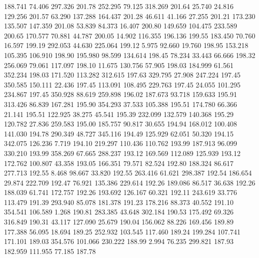  188.741   74.406  297.326       201.78
 252.295   79.125  318.269       201.64
  25.740   24.816  129.256       201.57
  63.290  137.288  164.437       201.28
  46.611   41.166   27.255       201.21
 173.230  135.507  147.359       201.08
  53.839   84.373   16.407       200.80
 149.659  104.475  233.589       200.65
 170.577   70.881   44.787       200.05
  14.902  116.355  196.136       199.55
 183.450   70.760   16.597       199.19
 292.053   44.630  225.064       199.12
   5.975   92.660   19.760       198.95
 153.218  105.395  106.910       198.90
 195.980   98.599  134.614       198.45
  78.234   33.443   66.666       198.32
 256.069   79.061  117.097       198.10
  11.675  130.756   57.905       198.03
 184.999   61.561  352.234       198.03
 171.520  113.282  312.615       197.63
 329.795   27.908  247.224       197.45
 350.585  150.111   22.436       197.45
 113.091  108.495  229.763       197.45
  24.055  101.295  234.867       197.45
 350.928   88.619  259.898       196.02
 187.673   93.718  159.633       195.91
 313.426   86.839  167.281       195.90
 354.293   37.533  105.388       195.51
 174.780   66.366   21.141       195.51
 122.925   38.275   45.541       195.39
 232.099  132.579  140.368       195.29
 120.782   27.836  259.583       195.00
 185.757   90.817   30.655       194.94
 168.012  100.408  141.030       194.78
 290.349   48.727  345.116       194.49
 125.929   62.051   50.320       194.15
 342.075  126.236    7.719       194.10
 219.297  110.436  110.762       193.99
 187.913   96.099  330.210       193.99
 358.269   67.665  288.237       193.12
 169.569  112.089  125.939       193.12
 172.762  100.807   43.358       193.05
 166.351   79.571   82.524       192.80
 188.324   86.617  277.713       192.55
   8.468   98.667   33.820       192.55
 263.416   61.621  298.387       192.54
 186.654   29.874  222.709       192.47
  76.921  135.386  229.614       192.26
 189.086   86.517   36.638       192.26
 188.039   61.741  172.757       192.26
 193.692  126.167   60.321       192.11
 243.619   33.776  113.479       191.39
 293.940   85.078  181.378       191.23
 178.216   88.373   40.552       191.10
 354.541  106.589    1.268       190.81
 283.385   43.648  302.184       190.53
 175.492   69.326  316.849       190.31
  43.117  127.090   25.679       190.04
 156.062   88.226  169.456       189.89
 177.388   56.095   18.694       189.25
 252.932  103.545  117.460       189.24
 199.284  107.741  171.101       189.03
 354.576  101.066  230.222       188.99
   2.994   76.235  299.821       187.93
 182.959  111.955   77.185       187.78
